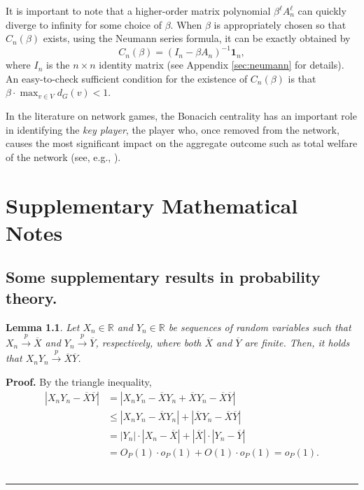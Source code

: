 \documentclass[10.5pt, A4paper, openany, uplatex]{book}
\renewcommand{\bar}{\overline}
\newtheorem{lemma}[theorem]{Lemma}
\newenvironment{proof}[1][Proof]{\textbf{#1.} }{\  \rule{0.5em}{0.5em}}
\numberwithin{equation}{section}
\begin{document}
\begin{appendices}
	It is important to note that a higher-order matrix polynomial $\beta^\ell A_n^\ell$ can quickly diverge to infinity for some choice of $\beta$.
	When $\beta$ is appropriately chosen so that $C_n(\beta)$ exists, using the Neumann series formula, it can be exactly obtained by
	\[
	C_n(\beta) = \left(I_n - \beta A_n \right)^{-1}\mathbf{1}_n,
	\]
	where $I_n$ is the $n \times n$ identity matrix (see Appendix \ref{sec:neumann} for details).
	An easy-to-check sufficient condition for the existence of $C_n(\beta)$ is that $\beta \cdot \max_{v \in V}d_G(v) < 1$.
	
	In the literature on network games, the Bonacich centrality has an important role in identifying the \textit{key player}, the player who, once removed from the network, causes the most significant impact on the aggregate outcome such as total welfare of the network (see, e.g., \cite{ballester2006s}).
	
	
	\chapter{Supplementary Mathematical Notes}
	\section{Some supplementary results in probability theory.}
	\begin{lemma}\label{lem:prodconv}
	Let $X_n \in \mathbb{R}$ and $Y_n \in \mathbb{R}$ be sequences of random variables such that $X_n \overset{p}{\to} \bar X$ and $Y_n \overset{p}{\to} \bar Y$, respectively, where both $\bar X$ and $\bar Y$ are finite.
	Then, it holds that $X_n Y_n \overset{p}{\to} \bar X \bar Y$.
	\end{lemma}
	
	\begin{proof}
		By the triangle inequality,
		\begin{align*}
		|X_n Y_n - \bar X \bar Y|
		& = |X_n Y_n - \bar X Y_n + \bar X Y_n - \bar X \bar Y| \\
		& \le |X_n Y_n - \bar X Y_n| + |\bar X Y_n - \bar X \bar Y| \\
		& = |Y_n| \cdot |X_n - \bar X| + |\bar X |\cdot | Y_n - \bar Y| \\
		& = O_P(1) \cdot o_P(1) + O(1) \cdot o_P(1) = o_P(1). 
		\end{align*}
	\end{proof}
	

\end{appendices}
\end{document}
